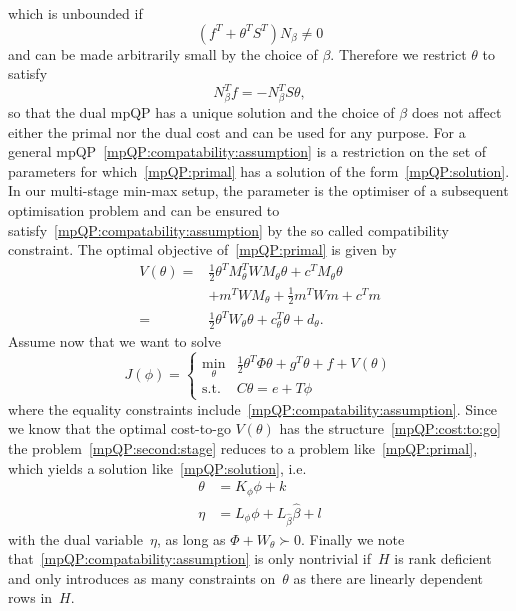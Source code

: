 \documentclass{ifacconf}
\begin{document}
which is unbounded if
\begin{equation}
	(f^T+\theta^TS^T)N_\beta \neq 0
\end{equation}
and can be made arbitrarily small by the choice of $\beta$. Therefore we restrict $\theta$ to satisfy 
\begin{equation}\label{mpQP:compatability:assumption}
	N_\beta^Tf = -N_\beta^TS\theta,
\end{equation} 
so that the dual mpQP has a unique solution
and the choice of $\beta$ does not affect either the primal nor the dual cost and can be used for
any purpose. For a general mpQP~\eqref{mpQP:compatability:assumption} is a restriction on the set
of parameters for which~\eqref{mpQP:primal} has a solution of the form~\eqref{mpQP:solution}.
In our multi-stage min-max setup, the parameter is the optimiser of a subsequent optimisation
problem and can be ensured to satisfy~\eqref{mpQP:compatability:assumption} by the so called 
compatibility constraint. The optimal objective of~\eqref{mpQP:primal} is given by
\begin{equation}\label{mpQP:cost:to:go}\begin{split}
	V(\theta) = &\frac{1}{2}\theta^T M_\theta^T W M_\theta \theta + c^TM_\theta \theta
\\&+ m^TWM_\theta+\frac{1}{2}m^T Wm + c^Tm\\
=&\frac{1}{2} \theta^T W_\theta \theta + c^T_\theta \theta + d_\theta.
\end{split}\end{equation}
%
Assume now that we want to solve
\begin{equation}\label{mpQP:second:stage}
	J(\phi) = \left\{\begin{array}{rl}
	\min_\theta & \frac{1}{2}\theta^T\Phi\theta + g^T\theta + f + V(\theta)\\
	\text{s.t.} & C\theta = e+T\phi
	\end{array}\right.
\end{equation}
where the equality constraints include~\eqref{mpQP:compatability:assumption}. Since we know
that the optimal cost-to-go $V(\theta)$ has the structure~\eqref{mpQP:cost:to:go}
the problem~\eqref{mpQP:second:stage} reduces to a problem like~\eqref{mpQP:primal},
which yields a solution like~\eqref{mpQP:solution}, i.e.
\begin{equation}
\begin{split}
	\theta &= K_\phi \phi + k\\
	\eta &= L_\phi \phi + L_{\hat\beta} \hat\beta + l
\end{split}
\end{equation}
with the dual variable~$\eta$, as long as $\Phi+W_\theta\succ 0$. Finally we note 
that~\eqref{mpQP:compatability:assumption} is only nontrivial if~$H$ is rank deficient and only 
introduces as many constraints on~$\theta$ as there are linearly
dependent rows in~$H$.
\end{document}
